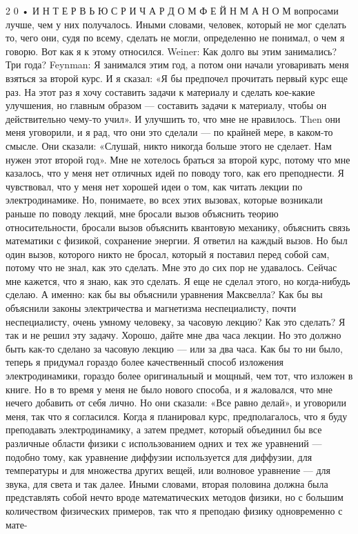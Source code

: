 \documentclass[11pt,oneside]{article}
\begin{document}
2 0 • И Н Т Е Р В Ь Ю  С  Р И Ч А Р Д О М  Ф Е Й Н М А Н О М вопросами лучше, чем у них получалось. Иными словами, человек, который не мог сделать то, чего они, судя по всему, сделать не могли, определенно не понимал, о чем я говорю. Вот как я к этому относился. Weiner: Как долго вы этим занимались? Три года? Feynman: Я занимался этим год, а потом они начали уговаривать меня взяться за второй курс. И я сказал: «Я бы предпочел прочитать первый курс еще раз. На этот раз я хочу составить задачи к материалу и сделать кое-какие улучшения, но главным образом --- составить задачи к материалу, чтобы он действительно чему-то учил». И улучшить то, что мне не нравилось. Then они меня уговорили, и я рад, что они это сделали --- по крайней мере, в каком-то смысле. Они сказали: «Слушай, никто никогда больше этого не сделает. Нам нужен этот второй год». Мне не хотелось браться за второй курс, потому что мне казалось, что у меня нет отличных идей по поводу того, как его преподнести. Я чувствовал, что у меня нет хорошей идеи о том, как читать лекции по электродинамике. Но, понимаете, во всех этих вызовах, которые возникали раньше по поводу лекций, мне бросали вызов объяснить теорию относительности, бросали вызов объяснить квантовую механику, объяснить связь математики с физикой, сохранение энергии. Я ответил на каждый вызов. Но был один вызов, которого никто не бросал, который я поставил перед собой сам, потому что не знал, как это сделать. Мне это до сих пор не удавалось. Сейчас мне кажется, что я знаю, как это сделать. Я еще не сделал этого, но когда-нибудь сделаю. А именно: как бы вы объяснили уравнения Максвелла? Как бы вы объяснили законы электричества и магнетизма неспециалисту, почти неспециалисту, очень умному человеку, за часовую лекцию? Как это сделать? Я так и не решил эту задачу. Хорошо, дайте мне два часа лекции. Но это должно быть как-то сделано за часовую лекцию --- или за два часа. Как бы то ни было, теперь я придумал гораздо более качественный способ изложения электродинамики, гораздо более оригинальный и мощный, чем тот, что изложен в книге. Но в то время у меня не было нового способа, и я жаловался, что мне нечего добавить от себя лично. Но они сказали: «Все равно делай», и уговорили меня, так что я согласился. Когда я планировал курс, предполагалось, что я буду преподавать электродинамику, а затем предмет, который объединил бы все различные области физики с использованием одних и тех же уравнений --- подобно тому, как уравнение диффузии используется для диффузии, для температуры и для множества других вещей, или волновое уравнение --- для звука, для света и так далее. Иными словами, вторая половина должна была представлять собой нечто вроде математических методов физики, но с большим количеством физических примеров, так что я преподаю физику одновременно с мате-\par
\end{document}
